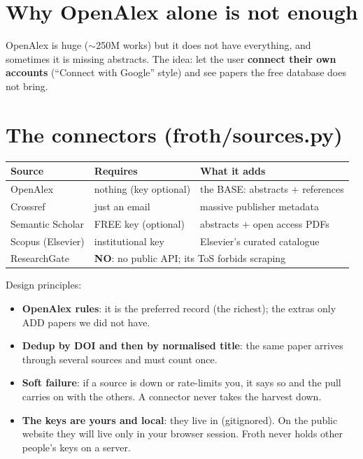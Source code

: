 \documentclass[11pt,a4paper]{article}
\begin{document}

\section{Why OpenAlex alone is not enough}

OpenAlex is huge ($\sim$250M works) but it does not have everything, and sometimes it is
missing abstracts. The idea: let the user \textbf{connect their own accounts} (``Connect with
Google'' style) and see papers the free database does not bring.

\section{The connectors (froth/sources.py)}

\begin{center}
\begin{tabular}{lll}
\textbf{Source} & \textbf{Requires} & \textbf{What it adds} \\
\hline
OpenAlex & nothing (key optional) & the BASE: abstracts $+$ references \\
Crossref & just an email & massive publisher metadata \\
Semantic Scholar & FREE key (optional) & abstracts $+$ open access PDFs \\
Scopus (Elsevier) & institutional key & Elsevier's curated catalogue \\
ResearchGate & \multicolumn{2}{l}{\textbf{NO}: no public API; its ToS forbids scraping} \\
\end{tabular}
\end{center}

Design principles:
\begin{itemize}
  \item \textbf{OpenAlex rules}: it is the preferred record (the richest); the extras only ADD
        papers we did not have.
  \item \textbf{Dedup by DOI and then by normalised title}: the same paper arrives through
        several sources and must count once.
  \item \textbf{Soft failure}: if a source is down or rate-limits you, it says so and the pull
        carries on with the others. A connector never takes the harvest down.
  \item \textbf{The keys are yours and local}: they live in 
        (gitignored). On the public website they will live only in your browser session.
        Froth never holds other people's keys on a server.
\end{itemize}
\end{document}
